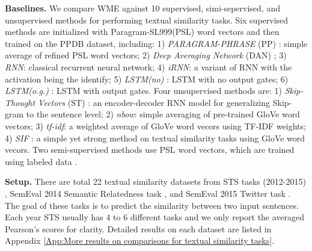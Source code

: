 \documentclass[11pt,a4paper]{article}
\newcommand{\1}{\boldsymbol{1}}
\begin{document}
\vskip0.05in
\noindent
\textbf{Baselines.} We compare WME against 10 supervised, simi-sepervised, and unsupervised methods for performing textual similarity tasks. 
Six supervised methods are initialized with Paragram-SL999(PSL) word vectors \cite{wieting2015ppdb} and then trained on the PPDB dataset, including: 1) \emph{PARAGRAM-PHRASE} (PP) \cite{wieting2015towards}: simple average of refined PSL word vectors; 2) \emph{Deep Averaging Network} (DAN) \cite{iyyer2015deep}; 3) \emph{RNN}: classical recurrent neural network; 4) \emph{iRNN}: a variant of RNN with the activation being the identify; 5) \emph{LSTM(no)} \cite{gers2002learning}: LSTM with no output gates; 6) \emph{LSTM(o.g.)} \cite{gers2002learning}: LSTM with output gates. 
Four unsupervised methods are: 1) \emph{Skip-Thought Vectors} (ST) \cite{kiros2015skip}: an encoder-decoder RNN model for generalizing Skip-gram to the sentence level; 2) \emph{nbow}: simple averaging of pre-trained GloVe word vectors; 3) \emph{tf-idf}: a weighted average of GloVe word vecors using TF-IDF weights; 4) \emph{SIF} \cite{arora2017simple}: a simple yet strong method on textual similarity tasks using GloVe word vecors.
Two semi-supervised methods use PSL word vectors, which are trained using labeled data \cite{wieting2015ppdb}.

\vskip0.05in
\noindent
\textbf{Setup.} There are total 22 textual similarity datasets from STS tasks (2012-2015) \cite{agirre2012semeval,agirre2013sem,agirre2014semeval,agirre2015semeval}, SemEval 2014 Semantic Relatedness task \cite{xu2015semeval}, and SemEval 2015 Twitter task \cite{marelli2014semeval}. 
The goal of these tasks is to predict the similarity between two input sentences. 
Each year STS usually has 4 to 6 different tasks and we only report the averaged Pearson's scores for clarity.
Detailed results on each dataset are listed in Appendix \ref{App:More results on comparisons for textual similarity tasks}. 
\end{document}

